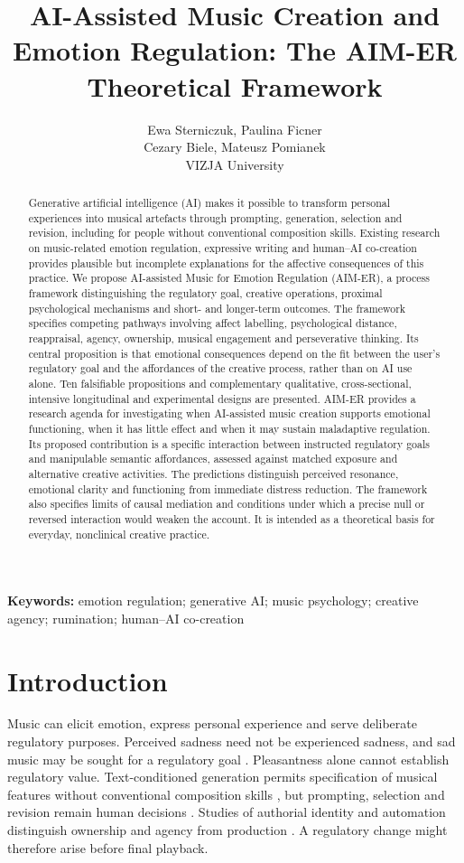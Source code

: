 \documentclass[11pt,a4paper]{article}
\title{AI-Assisted Music Creation and Emotion Regulation: The AIM-ER Theoretical Framework}
\author{Ewa Sterniczuk, Paulina Ficner\\Cezary Biele, Mateusz Pomianek\\[0.4em]\small VIZJA University}
\date{}
\begin{document}
\maketitle
\begin{abstract}
Generative artificial intelligence (AI) makes it possible to transform personal experiences into musical artefacts through prompting, generation, selection and revision, including for people without conventional composition skills. Existing research on music-related emotion regulation, expressive writing and human--AI co-creation provides plausible but incomplete explanations for the affective consequences of this practice. We propose AI-assisted Music for Emotion Regulation (AIM-ER), a process framework distinguishing the regulatory goal, creative operations, proximal psychological mechanisms and short- and longer-term outcomes. The framework specifies competing pathways involving affect labelling, psychological distance, reappraisal, agency, ownership, musical engagement and perseverative thinking. Its central proposition is that emotional consequences depend on the fit between the user's regulatory goal and the affordances of the creative process, rather than on AI use alone. Ten falsifiable propositions and complementary qualitative, cross-sectional, intensive longitudinal and experimental designs are presented. AIM-ER provides a research agenda for investigating when AI-assisted music creation supports emotional functioning, when it has little effect and when it may sustain maladaptive regulation. Its proposed contribution is a specific interaction between instructed regulatory goals and manipulable semantic affordances, assessed against matched exposure and alternative creative activities. The predictions distinguish perceived resonance, emotional clarity and functioning from immediate distress reduction. The framework also specifies limits of causal mediation and conditions under which a precise null or reversed interaction would weaken the account. It is intended as a theoretical basis for everyday, nonclinical creative practice.
\end{abstract}
\noindent\textbf{Keywords:} emotion regulation; generative AI; music psychology; creative agency; rumination; human--AI co-creation

\section{Introduction}
Music can elicit emotion, express personal experience and serve deliberate regulatory purposes. Perceived sadness need not be experienced sadness, and sad music may be sought for a regulatory goal \citep{saarikallio2007,juslin2008,gross2015}. Pleasantness alone cannot establish regulatory value. Text-conditioned generation permits specification of musical features without conventional composition skills \citep{copet2023}, but prompting, selection and revision remain human decisions \citep{huang2020}. Studies of authorial identity and automation distinguish ownership and agency from production \citep{zhao2026,he2026}. A regulatory change might therefore arise before final playback.
\end{document}
